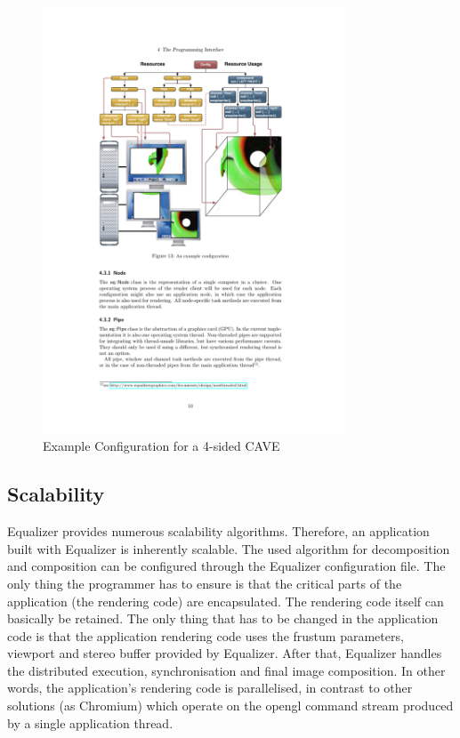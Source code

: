 \begin{figure}[H]
	\centering
	\includegraphics[width=0.8\textwidth]{../figures/eqSampleConfig}
	\caption{Example Configuration for a 4-sided CAVE\cite[p. 10]{eqPG}}
	\label{fig:eqSampleConfig}
\end{figure}

\subsection{Scalability}
Equalizer provides numerous scalability algorithms. Therefore, an application built with Equalizer is inherently scalable. The used algorithm for decomposition and composition can be configured through the Equalizer configuration file. The only thing the programmer has to ensure is that the critical parts of the application (the rendering code) are encapsulated. The rendering code itself can basically be retained. The only thing that has to be changed in the application code is that the application rendering code uses the frustum parameters, viewport and stereo buffer provided by Equalizer. After that, Equalizer handles the distributed execution, synchronisation and final image composition. In other words, the application's rendering code is parallelised, in contrast to other solutions (as Chromium) which operate on the \gls{opengl} command stream produced by a single application thread.

